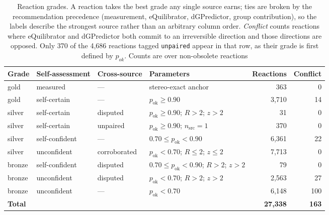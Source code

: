 \begin{table}[h] \centering\small
\begin{tabular}{llllrr}
\toprule
Grade & Self-assessment & Cross-source & Parameters & Reactions & Conflict \\
\midrule
gold   & measured       & ---          & stereo-exact anchor & 363 & 0 \\
gold   & self-certain   & ---          & $p_{\text{ok}} \ge 0.90$ & 3{,}710 & 14 \\
\midrule
silver & self-certain   & disputed     & $p_{\text{ok}} \ge 0.90$; $R > 2$; $z > 2$ & 31 & 0 \\
silver & self-certain   & unpaired     & $p_{\text{ok}} \ge 0.90$; $n_{\text{src}} = 1$ & 370 & 0 \\
silver & self-confident & ---          & $0.70 \le p_{\text{ok}} < 0.90$ & 6{,}361 & 22 \\
silver & unconfident    & corroborated & $p_{\text{ok}} < 0.70$; $R \le 2$; $z \le 2$ & 7{,}713 & 0 \\
\midrule
bronze & self-confident & disputed     & $0.70 \le p_{\text{ok}} < 0.90$; $R > 2$; $z > 2$ & 79 & 0 \\
bronze & unconfident    & disputed     & $p_{\text{ok}} < 0.70$; $R > 2$; $z > 2$ & 2{,}563 & 27 \\
bronze & unconfident    & ---          & $p_{\text{ok}} < 0.70$ & 6{,}148 & 100 \\
\midrule
\multicolumn{4}{l}{\textbf{Total}} & \textbf{27{,}338} & \textbf{163} \\
\bottomrule
\end{tabular}
\caption{Reaction grades. A reaction takes the best grade any single source earns; ties are broken by the recommendation precedence (measurement, eQuilibrator, dGPredictor, group contribution), so the labels describe the strongest source rather than an arbitrary column order. \emph{Conflict} counts reactions where eQuilibrator and dGPredictor both commit to an irreversible direction and those directions are opposed.  Only 370 of the 4{,}686 reactions tagged \texttt{unpaired} appear in that row, as their grade is first defined by $p_{ok}$. Counts are over non-obsolete reactions}\label{tab:grades} \end{table}
